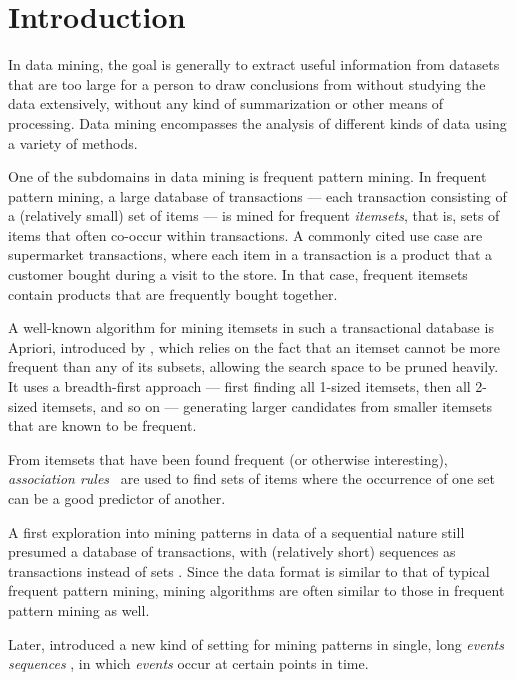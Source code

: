 \chapter{Introduction}

In data mining, the goal is generally to extract useful information from datasets that are too large for a person to draw conclusions from without studying the data extensively, without any kind of summarization or other means of processing. Data mining encompasses the analysis of different kinds of data using a variety of methods.

One of the subdomains in data mining is frequent pattern mining. In frequent pattern mining, a large database of transactions --- each transaction consisting of a (relatively small) set of items --- is mined for frequent \emph{itemsets}, that is, sets of items that often co-occur within transactions. A commonly cited use case are supermarket transactions, where each item in a transaction is a product that a customer bought during a visit to the store. In that case, frequent itemsets contain products that are frequently bought together.

A well-known algorithm for mining itemsets in such a transactional database is Apriori, introduced by \citeauthor{agrawal1994fast} \citep{agrawal1994fast}, which relies on the fact that an itemset cannot be more frequent than any of its subsets, allowing the search space to be pruned heavily. It uses a breadth-first approach --- first finding all 1-sized itemsets, then all 2-sized itemsets, and so on --- generating larger candidates from smaller itemsets that are known to be frequent.

From itemsets that have been found frequent (or otherwise interesting), \emph{association rules}~\cite{agrawal1994fast} are used to find sets of items where the occurrence of one set can be a good predictor of another.

A first exploration into mining patterns in data of a sequential nature still presumed a database of transactions, with (relatively short) sequences as transactions instead of sets \citep{agrawal1995mining}.
Since the data format is similar to that of typical frequent pattern mining, mining algorithms are often similar to those in frequent pattern mining as well.

Later, \citeauthor{mannila1997discovery} introduced a new kind of setting for mining patterns in single, long \emph{events sequences} \citep{mannila1997discovery}, in which \emph{events} occur at certain points in time.


